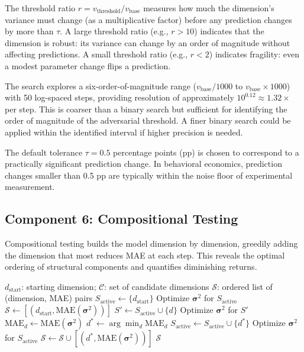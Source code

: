 \documentclass[12pt]{article}
\newcommand{\MAE}{\mathrm{MAE}}
\begin{document}
The threshold ratio $r = v_{\mathrm{threshold}} / v_{\mathrm{base}}$ measures how much the dimension's variance must change (as a multiplicative factor) before any prediction changes by more than $\tau$.  A large threshold ratio (e.g., $r > 10$) indicates that the dimension is robust: its variance can change by an order of magnitude without affecting predictions.  A small threshold ratio (e.g., $r < 2$) indicates fragility: even a modest parameter change flips a prediction.

The search explores a six-order-of-magnitude range ($v_{\mathrm{base}} / 1000$ to $v_{\mathrm{base}} \times 1000$) with 50 log-spaced steps, providing resolution of approximately $10^{0.12} \approx 1.32\times$ per step.  This is coarser than a binary search but sufficient for identifying the order of magnitude of the adversarial threshold.  A finer binary search could be applied within the identified interval if higher precision is needed.

The default tolerance $\tau = 0.5$ percentage points (pp) is chosen to correspond to a practically significant prediction change.  In behavioral economics, prediction changes smaller than 0.5 pp are typically within the noise floor of experimental measurement.

\subsection{Component 6: Compositional Testing}

Compositional testing builds the model dimension by dimension, greedily adding the dimension that most reduces MAE at each step.  This reveals the optimal ordering of structural components and quantifies diminishing returns.

\begin{algorithm}[H]
\caption{\textsc{CompositionalTest}$(d_{\mathrm{start}}, \mathcal{C})$}
\label{alg:compositional}
\begin{algorithmic}[1]
\REQUIRE $d_{\mathrm{start}}$: starting dimension; $\mathcal{C}$: set of candidate dimensions
\ENSURE $\mathcal{S}$: ordered list of (dimension, MAE) pairs
\STATE $S_{\mathrm{active}} \leftarrow \{d_{\mathrm{start}}\}$
\STATE Optimize $\boldsymbol{\sigma}^2$ for $S_{\mathrm{active}}$ 
\STATE $\mathcal{S} \leftarrow [(d_{\mathrm{start}}, \MAE(\boldsymbol{\sigma}^2))]$
        \STATE $S' \leftarrow S_{\mathrm{active}} \cup \{d\}$
        \STATE Optimize $\boldsymbol{\sigma}^2$ for $S'$ 
        \STATE $\MAE_d \leftarrow \MAE(\boldsymbol{\sigma}^2)$
    \ENDFOR
    \STATE $d^* \leftarrow \arg\min_d \MAE_d$
    \STATE $S_{\mathrm{active}} \leftarrow S_{\mathrm{active}} \cup \{d^*\}$
    \STATE Optimize $\boldsymbol{\sigma}^2$ for $S_{\mathrm{active}}$ 
    \STATE $\mathcal{S} \leftarrow \mathcal{S} \cup [(d^*, \MAE(\boldsymbol{\sigma}^2))]$
\ENDWHILE
\RETURN $\mathcal{S}$
\end{algorithmic}
\end{algorithm}
\end{document}
